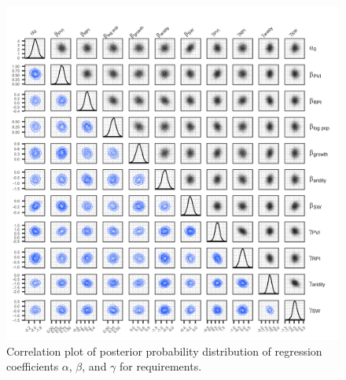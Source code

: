 \documentclass[draft]{agujournal}\usepackage{knitr}
\begin{document}
\begin{figure}
\includegraphics[width=6.25in]{figures_si/req_pairs_plot-1} \caption[Correlation plot of posterior probability distribution of regression coefficients $\alpha$, $\beta$, and $\gamma$ for requirements]{Correlation plot of posterior probability distribution of regression coefficients $\alpha$, $\beta$, and $\gamma$ for requirements.}\label{fig:req_pairs_plot}
\end{figure}



\end{document}
